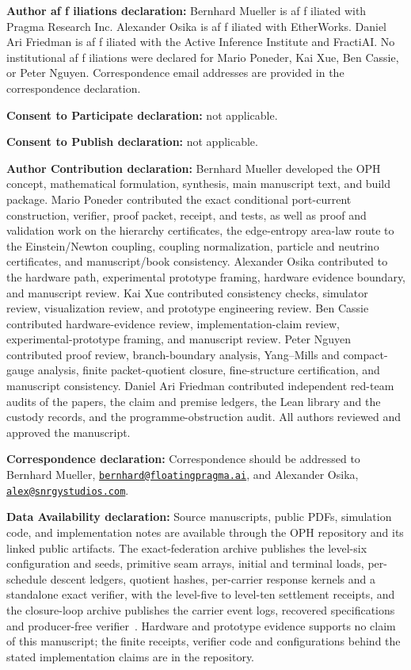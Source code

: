 \documentclass[11pt]{article}
\begin{document}
\noindent\textbf{Author af\kern0pt f\kern0pt iliations declaration:} Bernhard Mueller is af\kern0pt f\kern0pt iliated with
Pragma Research Inc. Alexander Osika is af\kern0pt f\kern0pt iliated with EtherWorks. Daniel Ari Friedman is af\kern0pt f\kern0pt iliated with the Active Inference Institute and FractiAI. No institutional af\kern0pt f\kern0pt iliations were declared for Mario Poneder, Kai
Xue, Ben Cassie, or Peter Nguyen.
Correspondence email addresses are provided in the correspondence declaration.

\noindent\textbf{Consent to Participate declaration:} not applicable.

\noindent\textbf{Consent to Publish declaration:} not applicable.

\noindent\textbf{Author Contribution declaration:} Bernhard Mueller developed the OPH concept,
mathematical formulation, synthesis, main manuscript text, and build package. Mario Poneder
contributed the exact conditional port-current construction, verifier, proof packet, receipt, and
tests, as well as proof and validation work on the hierarchy certificates, the edge-entropy
area-law route to the Einstein/Newton coupling, coupling normalization, particle and neutrino
certificates, and manuscript/book consistency. Alexander Osika contributed to the hardware path, experimental prototype framing, hardware evidence boundary, and manuscript review. Kai Xue contributed consistency
checks, simulator review, visualization review, and prototype engineering
review. Ben Cassie contributed hardware-evidence review, implementation-claim
review, experimental-prototype framing, and manuscript review. Peter
Nguyen contributed proof review, branch-boundary analysis, Yang--Mills and
compact-gauge analysis, finite packet-quotient closure, fine-structure
certification, and manuscript consistency. Daniel Ari Friedman contributed
independent red-team audits of the papers, the claim and premise ledgers, the
Lean library and the custody records, and the programme-obstruction audit.
All authors reviewed and approved the manuscript.

\noindent\textbf{Correspondence declaration:} Correspondence should be addressed to Bernhard
Mueller, \href{mailto:bernhard@floatingpragma.ai}{\texttt{bernhard@floatingpragma.ai}}, and
Alexander Osika, \href{mailto:alex@snrgystudios.com}{\texttt{alex@snrgystudios.com}}.

\noindent\textbf{Data Availability declaration:} Source manuscripts, public
PDFs, simulation code, and implementation notes are available through the OPH
repository and its linked public artifacts. The exact-federation archive
publishes the level-six configuration and seeds, primitive seam arrays,
initial and terminal loads, per-schedule descent ledgers, quotient hashes,
per-carrier response kernels and a standalone exact verifier, with the
level-five to level-ten settlement receipts, and the closure-loop archive
publishes the carrier event logs, recovered specifications and producer-free
verifier~\cite{ophfpe}. Hardware and prototype evidence supports no claim of this manuscript; the finite receipts, verifier code and configurations behind the stated implementation claims are in the repository.
\end{document}
